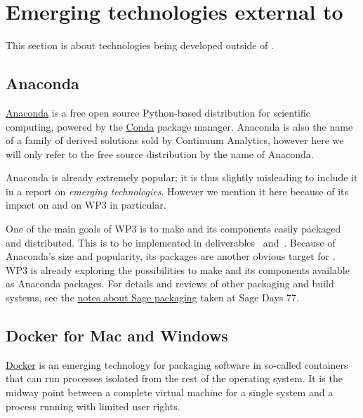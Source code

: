 \documentclass{deliverablereport}
\author{Erik Bray, Luca De Feo, Viviane Pons, Tom Wiesing}
\begin{document}
\maketitle
\githubissuedescription
\tableofcontents
\newpage

\section{Emerging technologies external to \ODK}
\label{sec:external}

This section is about technologies being developed outside of \ODK.

\subsection{Anaconda}
\label{sec:anaconda}

\href{https://www.continuum.io/anaconda-overview}{Anaconda} is a free
open source Python-based distribution for scientific computing,
powered by the \href{http://conda.pydata.org/docs/}{Conda} package
manager. Anaconda is also the name of a family of derived solutions
sold by Continuum Analytics, however here we will only refer to the
free source distribution by the name of Anaconda.

Anaconda is already extremely popular; it is thus slightly misleading
to include it in a report on \emph{emerging technologies}. However we
mention it here because of its impact on \ODK and on WP3 in
particular.

One of the main goals of WP3 is to make \Sage and its components
easily packaged and distributed. This is to be implemented in
deliverables~
and~. Because of
Anaconda's size and popularity, its packages are another obvious
target for \ODK. WP3 is already exploring the possibilities to make
\Sage and its components available as Anaconda packages.
For details and reviews of other packaging and build systems, see the
\href{https://wiki.sagemath.org/days77/packaging}{notes about Sage packaging}
taken at Sage Days 77.

\subsection{Docker for Mac and Windows}
\label{sec:docker}


\href{https://www.docker.com}{Docker} is an emerging technology for
packaging software in so-called containers that can run processes
isolated from the rest of the operating system. It is the midway point
between a complete virtual machine for a single system and a
process running with limited user rights.
\end{document}
